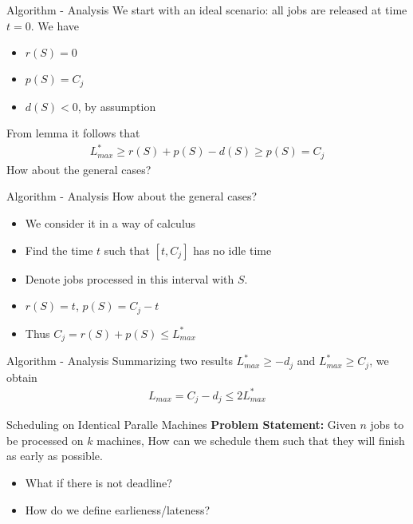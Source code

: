 \documentclass{beamer}
\newcommand*{\brk}{\\[10pt]}
\begin{document}
\begin{frame}{Algorithm - Analysis}
    We start with an ideal scenario: all jobs are released at time $t = 0$. We have 
    \begin{itemize}
        \item $r(S) = 0$ 
        \item $p(S) = C_j$ 
        \item $d(S) < 0$, by assumption
    \end{itemize}
    From lemma it follows that 
    \begin{align*}
        L_{max}^* \geq r(S) + p(S) - d(S) \geq p(S) = C_j
    \end{align*}
    \pause
    \color{red} How about the general cases? \color{black}
\end{frame}

\begin{frame}{Algorithm - Analysis}
    \color{red} How about the general cases? \color{black} 
    \begin{itemize}
        \item<1-> We consider it in a way of calculus
        \item<2-> Find the time $t$ such that $[t, C_j]$ has no idle time 
        \item<3-> Denote jobs processed in this interval with $S$.
        \item<4-> $r(S) = t$, $p(S) = C_j - t$ 
        \item<5> Thus $C_j = r(S) + p(S) \leq L_{max}^*$ 
    \end{itemize}
\end{frame}

\begin{frame}{Algorithm - Analysis} 
    Summarizing two results $L_{max}^* \geq -d_j$ and $L_{max}^* \geq C_j$, we obtain
    \begin{align*}
        L_{max} = C_j - d_j \leq 2L_{max}^*
    \end{align*}
\end{frame} 

\begin{frame}{Scheduling on Identical Paralle Machines}
    \textbf{Problem Statement: } Given $n$ jobs to be processed on $k$ 
    machines, How can we schedule them such that they will finish as early as possible. \brk 
    \begin{itemize}
        \item What if there is not deadline?
        \item How do we define earlieness/lateness?
    \end{itemize}
\end{frame}
\end{document}
